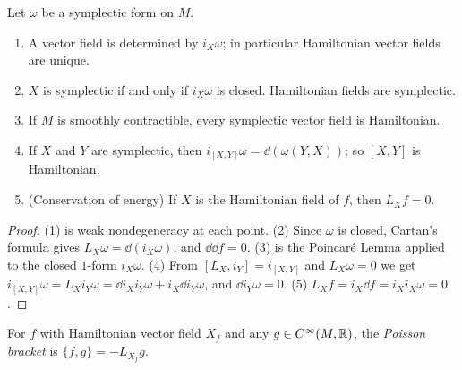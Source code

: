 \begin{theorem}
  \label{thm:hamiltonian-fields}
  \leanok
  Let $\omega$ be a symplectic form on $M$.
  \begin{enumerate}
    \item A vector field is determined by $i_X\omega$; in particular Hamiltonian vector fields
      are unique.
    \item $X$ is symplectic if and only if $i_X\omega$ is closed. Hamiltonian fields are
      symplectic.
    \item If $M$ is smoothly contractible, every symplectic vector field is Hamiltonian.
    \item If $X$ and $Y$ are symplectic, then $i_{[X, Y]}\omega = \dd(\omega(Y, X))$; so
      $[X, Y]$ is Hamiltonian.
    \item (Conservation of energy) If $X$ is the Hamiltonian field of $f$, then $L_X f = 0$.
  \end{enumerate}
\end{theorem}

\begin{proof}
  \leanok
  (1) is weak nondegeneracy at each point. (2) Since $\omega$ is closed, Cartan's formula gives
  $L_X \omega = \dd(i_X\omega)$; and $\dd \dd f = 0$. (3) is the Poincaré Lemma applied to the
  closed $1$-form $i_X\omega$. (4) From $[L_X, i_Y] = i_{[X, Y]}$ and $L_X\omega = 0$ we get
  $i_{[X, Y]}\omega = L_X i_Y\omega = \dd i_X i_Y \omega + i_X \dd i_Y\omega$, and
  $\dd i_Y \omega = 0$. (5) $L_X f = i_X \dd f = i_X i_X \omega = 0$.
\end{proof}

\begin{definition}
  \label{def:poisson}
  \leanok
  For $f$ with Hamiltonian vector field $X_f$ and any $g \in C^\infty(M, \mathbb{R})$, the
  \emph{Poisson bracket} is $\{f, g\} = -L_{X_f} g$.
\end{definition}

